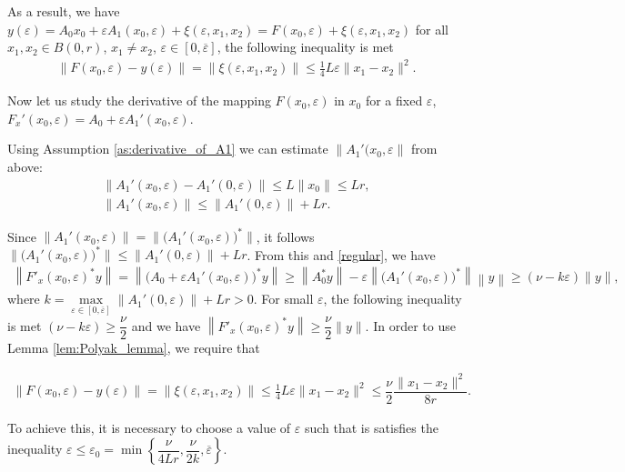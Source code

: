 \documentclass[../main.tex]{subfiles}
\begin{document}
As a result, we have $y(\varepsilon) = A_0x_0 + \varepsilon A_1(x_0,\varepsilon) + \xi(\varepsilon,x_1,x_2) = F(x_0,\varepsilon) + \xi(\varepsilon,x_1,x_2)$ for all $x_1, x_2 \in B(0,r)$, $x_1 \neq x_2$, $\varepsilon \in [0, \overline{\varepsilon}]$, the following inequality is met
\begin{gather*}
	\| F(x_0,\varepsilon) - y(\varepsilon) \| = \|\xi(\varepsilon,x_1,x_2)\| \leqslant \frac{1}{4}L\varepsilon\|x_1-x_2\|^2.
\end{gather*}


Now let us study the derivative of the mapping $F(x_0, \varepsilon)$ in $x_0$ for a fixed $\varepsilon$, $F_x'(x_0,\varepsilon) = A_0 + \varepsilon A_1'(x_0,\varepsilon) $.

Using Assumption \ref{as:derivative_of_A1} we can estimate $\|A_1'(x_0,\varepsilon\|$ from above:
\begin{gather*}
	\|A_1'(x_0,\varepsilon) - A_1'(0,\varepsilon)\| \leqslant 
	L\|x_0\| \leqslant
	L r, \\
	\|A_1'(x_0,\varepsilon)\|  \leqslant \| A_1'(0,\varepsilon)\| + Lr.
\end{gather*}

Since $\|A_1'(x_0,\varepsilon)\| = \|\big(A_1'(x_0,\varepsilon)\big)^*\| $, it follows  $\|\big(A_1'(x_0,\varepsilon)\big)^*\| \leqslant \| A_1'(0,\varepsilon)\| + Lr$.
From this and \eqref{regular}, we have 
\begin{gather*}
	\left\|F'_x(x_0, \varepsilon)^* y\right\| = \left\|\big(A_0 + \varepsilon A_1'(x_0, \varepsilon)\big)^* y\right\| \geqslant \left\|A_0^*y \right\| - \varepsilon \left\|\big(A_1'(x_0,\varepsilon)\big)^*\right\| \left\|y\right\| \geqslant (\nu - k\varepsilon)\|y\|,
\end{gather*} where $k = \max\limits_{\varepsilon \in [0,\overline{\varepsilon}]}\| A_1'(0,\varepsilon)\| + Lr > 0$.
For small $\varepsilon$, the following inequality is met $(\nu - k\varepsilon) \geqslant \dfrac{\nu}{2}$ and we have $\left\|F'_x(x_0, \varepsilon)^* y\right\| \geqslant \dfrac{\nu}{2} \|y\|$. In order to use Lemma \ref{lem:Polyak_lemma}, we require that

\begin{gather*}
	\| F(x_0,\varepsilon) - y(\varepsilon) \| = \|\xi(\varepsilon,x_1,x_2)\| \leqslant \frac{1}{4}L\varepsilon\|x_1-x_2\|^2 \leqslant \dfrac{\nu}{2} \dfrac{\|x_1-x_2\|^2}{8r}.
\end{gather*}

To achieve this, it is necessary to choose a value of $\varepsilon$ such that is satisfies the inequality $\varepsilon \leqslant \varepsilon_0 = \min\left\{\dfrac{\nu}{4Lr}, \dfrac{\nu}{2k}, \overline{\varepsilon}\right\}$. 
\end{document}
